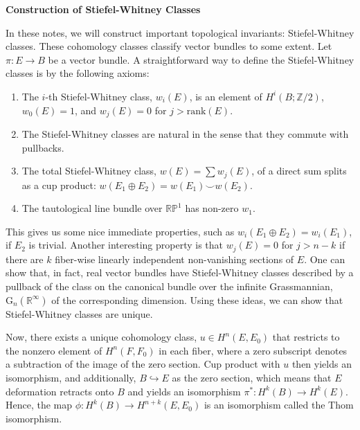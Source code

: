 \documentclass[12pt]{book}
\theoremstyle{definition}
\theoremstyle{remark}
\newcommand{\BR}{\mathbb R}
\newcommand{\BZ}{\mathbb Z}
\newcommand{\rank}{\mathrm{rank}}
\begin{document}
\begin{center}
\textbf{\Large Construction of Stiefel-Whitney Classes}
\end{center}

In these notes, we will construct important topological invariants: Stiefel-Whitney classes. These cohomology classes classify vector bundles to some extent. Let $\pi : E \to B$ be a vector bundle. A straightforward way to define the Stiefel-Whitney classes is by the following axioms:
\begin{enumerate}
\item The $i$-th Stiefel-Whitney class, $w_{i}(E)$, is an element of $H^{i}(B;\BZ/2)$, $w_{0}(E) = 1$, and $w_{j}(E) = 0$ for $j > \rank(E).$
\item The Stiefel-Whitney classes are natural in the sense that they commute with pullbacks.
\item The total Stiefel-Whitney class, $w(E) = \sum w_{j}(E)$, of a direct sum splits as a cup product: $w(E_{1} \oplus E_{2}) = w(E_{1}) \smile w(E_{2}).$
\item The tautological line bundle over $\mathbb{RP}^{1}$ has non-zero $w_{1}.$
\end{enumerate}

This gives us some nice immediate properties, such as $w_{i}(E_{1} \oplus E_{2}) = w_{i}(E_{1})$, if $E_{2}$ is trivial. Another interesting property is that $w_{j}(E) = 0$ for $j > n - k$ if there are $k$ fiber-wise linearly independent non-vanishing sections of $E.$ One can show that, in fact, real vector bundles have Stiefel-Whitney classes described by a pullback of the class on the canonical bundle over the infinite Grassmannian, $\mathrm{G}_{n}(\BR^{\infty})$ of the corresponding dimension. Using these ideas, we can show that Stiefel-Whitney classes are unique.

Now, there exists a unique cohomology class, $u \in H^{n}(E,E_{0})$ that restricts to the nonzero element of $H^{n}(F,F_{0})$ in each fiber, where a zero subscript denotes a subtraction of the image of the zero section. Cup product with $u$ then yields an isomorphism, and additionally, $B \hookrightarrow E$ as the zero section, which means that $E$ deformation retracts onto $B$ and yields an isomorphism $\pi^{*} : H^{k}(B) \to H^{k}(E).$ Hence, the map $\phi : H^{k}(B) \to H^{n + k}(E,E_{0})$ is an isomorphism called the Thom isomorphism.
\end{document}
